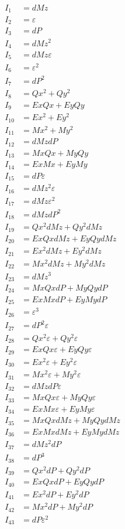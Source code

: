 \documentclass{article}
\begin{document}
\begin{align*}
I_{1} &= dMz \\
I_{2} &= ε \\
I_{3} &= dP \\
I_{4} &= dMz^{2} \\
I_{5} &= dMz ε \\
I_{6} &= ε^{2} \\
I_{7} &= dP^{2} \\
I_{8} &= Qx^{2} + Qy^{2} \\
I_{9} &= Ex Qx + Ey Qy \\
I_{10} &= Ex^{2} + Ey^{2} \\
I_{11} &= Mx^{2} + My^{2} \\
I_{12} &= dMz dP \\
I_{13} &= Mx Qx + My Qy \\
I_{14} &= Ex Mx + Ey My \\
I_{15} &= dP ε \\
I_{16} &= dMz^{2} ε \\
I_{17} &= dMz ε^{2} \\
I_{18} &= dMz dP^{2} \\
I_{19} &= Qx^{2} dMz + Qy^{2} dMz \\
I_{20} &= Ex Qx dMz + Ey Qy dMz \\
I_{21} &= Ex^{2} dMz + Ey^{2} dMz \\
I_{22} &= Mx^{2} dMz + My^{2} dMz \\
I_{23} &= dMz^{3} \\
I_{24} &= Mx Qx dP + My Qy dP \\
I_{25} &= Ex Mx dP + Ey My dP \\
I_{26} &= ε^{3} \\
I_{27} &= dP^{2} ε \\
I_{28} &= Qx^{2} ε + Qy^{2} ε \\
I_{29} &= Ex Qx ε + Ey Qy ε \\
I_{30} &= Ex^{2} ε + Ey^{2} ε \\
I_{31} &= Mx^{2} ε + My^{2} ε \\
I_{32} &= dMz dP ε \\
I_{33} &= Mx Qx ε + My Qy ε \\
I_{34} &= Ex Mx ε + Ey My ε \\
I_{35} &= Mx Qx dMz + My Qy dMz \\
I_{36} &= Ex Mx dMz + Ey My dMz \\
I_{37} &= dMz^{2} dP \\
I_{38} &= dP^{3} \\
I_{39} &= Qx^{2} dP + Qy^{2} dP \\
I_{40} &= Ex Qx dP + Ey Qy dP \\
I_{41} &= Ex^{2} dP + Ey^{2} dP \\
I_{42} &= Mx^{2} dP + My^{2} dP \\
I_{43} &= dP ε^{2} \\
\end{align*}
\end{document}
